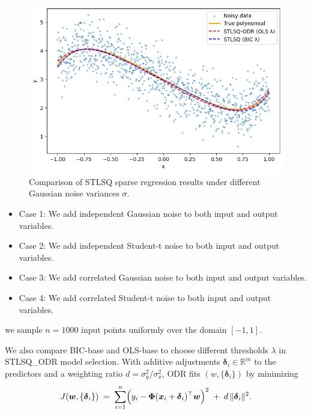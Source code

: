 \begin{figure}
\begin{minipage}{0.45\textwidth}
\end{minipage}
\begin{minipage}{0.45\textwidth}
    \centering
    \includegraphics[width=\linewidth]{MSc_Statistics_Research_Report_Template/images/2 0.5.png}
\end{minipage}
\caption{Comparison of STLSQ sparse regression results under different Gaussian noise variances $\sigma$.}
\label{fig:stlsq}
\end{figure}

\begin{itemize}
\item Case 1: We add independent Gaussian noise to both input and output variables.

\item Case 2: We add independent Student-t noise to both input and output variables.

\item Case 3: We add correlated Gaussian noise to both input and output variables.

\item Case 4: We add correlated Student-t noise to both input and output variables.
\end{itemize}
we sample $n=1000$ input points uniformly over the domain $[−1,1]$.

We also compare BIC-base and OLS-base to choose different thresholds $\lambda$ in STLSQ\_ODR model selection.
With additive adjustments $\boldsymbol{\delta}_i\in\mathbb{R}^m$ to the predictors and a weighting ratio $d = \sigma_y^{2}/\sigma_x^{2}$,
ODR fits $(w,\{\boldsymbol{\delta}_i\})$ by minimizing
\[
J(\boldsymbol{w},\{\boldsymbol{\delta}_i\}) \;=\; \sum_{i=1}^{n}
\Bigl( y_i - \mathbf{\Phi}(\boldsymbol{x}_i+\boldsymbol{\delta}_i)^\top \boldsymbol{w} \Bigr)^2
\;+\; d\,\|\boldsymbol{\delta}_i\|^2 .
\]



